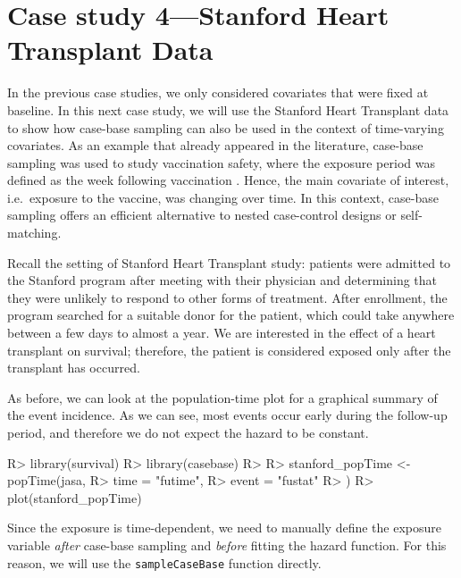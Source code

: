 \documentclass[
]{jss}
\begin{document}
\hypertarget{case-study-4stanford-heart-transplant-data}{%
\section{Case study 4---Stanford Heart Transplant
Data}\label{case-study-4stanford-heart-transplant-data}}

In the previous case studies, we only considered covariates that were
fixed at baseline. In this next case study, we will use the Stanford
Heart Transplant data
\citep[\citet{crowley1977covariance}]{clark1971cardiac} to show how
case-base sampling can also be used in the context of time-varying
covariates. As an example that already appeared in the literature,
case-base sampling was used to study vaccination safety, where the
exposure period was defined as the week following vaccination
\citep{saarela2015case}. Hence, the main covariate of interest,
i.e.~exposure to the vaccine, was changing over time. In this context,
case-base sampling offers an efficient alternative to nested
case-control designs or self-matching.

Recall the setting of Stanford Heart Transplant study: patients were
admitted to the Stanford program after meeting with their physician and
determining that they were unlikely to respond to other forms of
treatment. After enrollment, the program searched for a suitable donor
for the patient, which could take anywhere between a few days to almost
a year. We are interested in the effect of a heart transplant on
survival; therefore, the patient is considered exposed only after the
transplant has occurred.

As before, we can look at the population-time plot for a graphical
summary of the event incidence. As we can see, most events occur early
during the follow-up period, and therefore we do not expect the hazard
to be constant.

\begin{CodeChunk}

\begin{CodeInput}
R> library(survival)
R> library(casebase)
R> 
R> stanford_popTime <- popTime(jasa,
R>   time = "futime",
R>   event = "fustat"
R> )
R> plot(stanford_popTime)
\end{CodeInput}
\end{CodeChunk}

Since the exposure is time-dependent, we need to manually define the
exposure variable \emph{after} case-base sampling and \emph{before}
fitting the hazard function. For this reason, we will use the
\texttt{sampleCaseBase} function directly.
\end{document}
